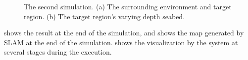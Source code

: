 \begin{figure}[h!]
    \centering
	\caption[The surrounding environment and target region for the second simulation.]{The second simulation. (a) The surrounding environment and target region. (b) The target region's varying depth seabed.}
	\label{fig:bm2_sim_env}
\end{figure} 

 shows the result at the end of the simulation, and  shows the map generated by SLAM at the end of the simulation.  shows the visualization by the system at several stages during the execution. 

